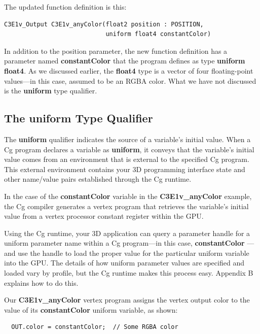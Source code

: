 \documentclass{book}
\begin{document}
The updated function definition is this:

\FloatBarrier
\begin{lstlisting}
C3E1v_Output C3E1v_anyColor(float2 position : POSITION,
                            uniform float4 constantColor)
\end{lstlisting}
\FloatBarrier

In addition to the position parameter, the new function definition has a parameter named \textbf{constantColor} that the program defines as type \textbf{uniform float4}. As we discussed earlier, the \textbf{float4} type is a vector of four floating-point values—in this case, assumed to be an RGBA color. What we have not discussed is the \textbf{uniform} type qualifier.

\subsection*{The uniform Type Qualifier}

The \textbf{uniform} qualifier indicates the source of a variable's initial value. When a Cg program declares a variable as \textbf{uniform}, it conveys that the variable's initial value comes from an environment that is external to the specified Cg program. This external environment contains your 3D programming interface state and other name/value pairs established through the Cg runtime.

In the case of the \textbf{constantColor} variable in the \textbf{C3E1v_anyColor} example, the Cg compiler generates a vertex program that retrieves the variable's initial value from a vertex processor constant register within the GPU.

Using the Cg runtime, your 3D application can query a parameter handle for a uniform parameter name within a Cg program—in this case, \textbf{constantColor} —and use the handle to load the proper value for the particular uniform variable into the GPU. The details of how uniform parameter values are specified and loaded vary by profile, but the Cg runtime makes this process easy. Appendix B explains how to do this.

Our \textbf{C3E1v_anyColor} vertex program assigns the vertex output color to the value of its \textbf{constantColor} uniform variable, as shown:

\FloatBarrier
\begin{lstlisting}
  OUT.color = constantColor;  // Some RGBA color
\end{lstlisting}
\FloatBarrier
\end{document}
